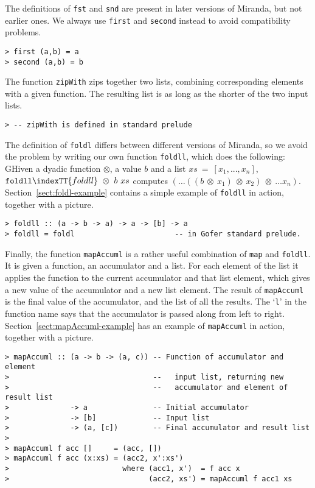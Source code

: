 The definitions of \mbox{\tt fst} and \mbox{\tt snd} are present in later versions of
Miranda, but not earlier ones.  We always use \mbox{\tt first} and \mbox{\tt second}
instead to avoid compatibility problems.
\begin{verbatim}
> first (a,b) = a
> second (a,b) = b
\end{verbatim}
%
%
The function \mbox{\tt zipWith} zips together two lists, combining corresponding
elements with a given function.  The resulting list is as long as the shorter
of the two input lists.
\begin{verbatim}
> -- zipWith is defined in standard prelude
\end{verbatim}
\par
The definition of \mbox{\tt foldl} differs between different versions of Miranda, so
we avoid the problem by writing our own function \mbox{\tt foldll}, which does the
following:
GHiven a dyadic function
$\otimes$, a value $b$ and a list $xs\ =\ [x_1,...,x_n]$,
$\mbox{\tt foldll}\indexTT{foldll}~ \otimes~ b~ xs$
computes
$( \ldots ((b~ \otimes~ x_1)~ \otimes~ x_2)~ \otimes~ \ldots x_n)$.
Section~\ref{sect:foldl-example} contains a
simple example of \mbox{\tt foldll} in action, together with a picture.
\begin{verbatim}
> foldll :: (a -> b -> a) -> a -> [b] -> a
> foldll = foldl                       -- in Gofer standard prelude.
\end{verbatim}
%
%
\par
Finally, the function \mbox{\tt mapAccuml} is a rather useful combination of \mbox{\tt map}
and \mbox{\tt foldll}.
It is given a function, an accumulator and a list.
For each element of the list it applies the function to the current
accumulator and that list element, which gives a new value of the accumulator
and a new list element.  The result of \mbox{\tt mapAccuml} is the final value of
the accumulator, and the list of all the results.  The `\mbox{\tt l}' in the
function name says that the accumulator is passed along from left to
right.
Section~\ref{sect:mapAccuml-example} has an example of \mbox{\tt mapAccuml} in
action, together with a picture.
\begin{verbatim}
> mapAccuml :: (a -> b -> (a, c)) -- Function of accumulator and element
>                                 --   input list, returning new
>                                 --   accumulator and element of result list
>              -> a               -- Initial accumulator
>              -> [b]             -- Input list
>              -> (a, [c])        -- Final accumulator and result list
>
> mapAccuml f acc []     = (acc, [])
> mapAccuml f acc (x:xs) = (acc2, x':xs')
>                          where (acc1, x')  = f acc x
>                                (acc2, xs') = mapAccuml f acc1 xs
\end{verbatim}
%
%
%


